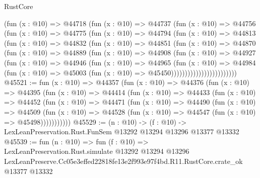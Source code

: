 \begin{lexlean}{RustCore}
\begin{coremodule}
                  (fun (x : @10) =>
                  @44718
                    (fun (x : @10) =>
                    @44737
                      (fun (x : @10) =>
                      @44756
                        (fun (x : @10) =>
                        @44775
                          (fun (x : @10) =>
                          @44794
                            (fun (x : @10) =>
                            @44813
                              (fun (x : @10) =>
                              @44832
                                (fun (x : @10) =>
                                @44851
                                  (fun (x : @10) =>
                                  @44870
                                    (fun (x : @10) =>
                                    @44889
                                      (fun (x : @10) =>
                                      @44908
                                        (fun (x : @10) =>
                                        @44927
                                          (fun (x : @10) =>
                                          @44946
                                            (fun (x : @10) =>
                                            @44965
                                              (fun (x : @10) =>
                                              @44984
                                                (fun (x : @10) =>
                                                @45003
                                                  (fun (x : @10) => @45450))))))))))))))))))))))))
@45521 := fun (x : @10) =>
  @44357
    (fun (x : @10) =>
    @44376
      (fun (x : @10) =>
      @44395
        (fun (x : @10) =>
        @44414
          (fun (x : @10) =>
          @44433
            (fun (x : @10) =>
            @44452
              (fun (x : @10) =>
              @44471
                (fun (x : @10) =>
                @44490
                  (fun (x : @10) =>
                  @44509
                    (fun (x : @10) =>
                    @44528 (fun (x : @10) => @44547 (fun (x : @10) => @45498)))))))))))
@45529 := (n : @10) ->
  (f : @10) -> LexLeanPreservation.Rust.FunSem @13292 @13294 @13296 @13377 @13332
@45539 := fun (n : @10) =>
  fun (f : @10) =>
  LexLeanPreservation.Rust.simulate
    @13292
    @13294
    @13296
    LexLeanPreserve.Cc05e3effed22818fe13e2f993e97f4bd.R11.RustCore.crate_ok
    @13377
    @13332
\end{coremodule}
\end{lexlean}
